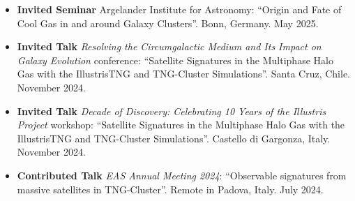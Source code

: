 \documentclass[a4paper,12pt,oneside]{article}
\begin{document}
\begin{itemize}[wide, labelwidth=!, labelindent=-11pt, noitemsep]
    \item {\bf Invited Seminar} Argelander Institute for Astronomy: ``Origin and Fate of Cool Gas in and around Galaxy Clusters''. Bonn, Germany. May 2025.
    \item {\bf Invited Talk}  {\it Resolving the Circumgalactic Medium and Its Impact on Galaxy Evolution} conference: ``Satellite Signatures in the Multiphase Halo Gas with the IllustrisTNG and TNG-Cluster Simulations''. Santa Cruz, Chile. November 2024.
    \item {\bf Invited Talk}  {\it Decade of Discovery: Celebrating 10 Years of the Illustris Project} workshop: ``Satellite Signatures in the Multiphase Halo Gas with the IllustrisTNG and TNG-Cluster Simulations''. Castello di Gargonza, Italy. November 2024.
    \item {\bf Contributed Talk} {\it EAS Annual Meeting 2024}: ``Observable signatures from massive satellites in TNG-Cluster''. Remote in Padova, Italy. July 2024.

\end{itemize}
\end{document}
